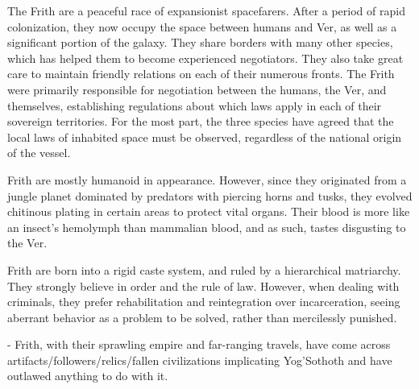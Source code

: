 \documentclass[blue]{guildcamp4}
\begin{document}
\name{\bFrith{}}

The Frith are a peaceful race of expansionist spacefarers. After a period of rapid colonization, they now occupy the space between humans and Ver, as well as a significant portion of the galaxy. They share borders with many other species, which has helped them to become experienced negotiators. They also take great care to maintain friendly relations on each of their numerous fronts. The Frith were primarily responsible for negotiation between the humans, the Ver, and themselves, establishing regulations about which laws apply in each of their sovereign territories. For the most part, the three species have agreed that the local laws of inhabited space must be observed, regardless of the national origin of the vessel.
	
Frith are mostly humanoid in appearance. However, since they originated from a jungle planet dominated by predators with piercing horns and tusks, they evolved chitinous plating in certain areas to protect vital organs. Their blood is more like an insect's hemolymph than mammalian blood, and as such, tastes disgusting to the Ver.

Frith are born into a rigid caste system, and ruled by a hierarchical matriarchy. They strongly believe in order and the rule of law. However, when dealing with criminals, they prefer rehabilitation and reintegration over incarceration, seeing aberrant behavior as a problem to be solved, rather than mercilessly punished.

- Frith, with their sprawling empire and far-ranging travels, have come across artifacts/followers/relics/fallen civilizations implicating Yog'Sothoth and have outlawed anything to do with it.
	
\end{document}
